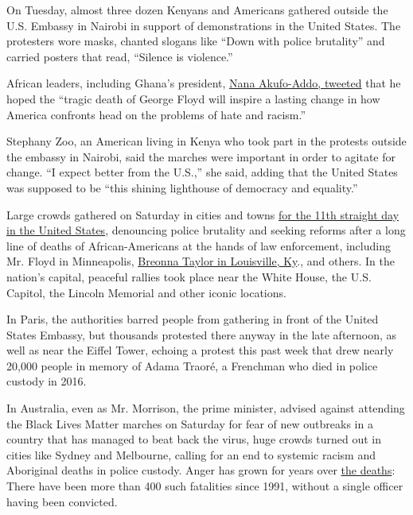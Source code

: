 On Tuesday, almost three dozen Kenyans and Americans gathered outside
the U.S. Embassy in Nairobi in support of demonstrations in the United
States. The protesters wore masks, chanted slogans like ``Down with
police brutality'' and carried posters that read, ``Silence is
violence.''

African leaders, including Ghana's president,
\href{https://twitter.com/NAkufoAddo/status/1267537316391849984}{Nana
Akufo-Addo, tweeted} that he hoped the ``tragic death of George Floyd
will inspire a lasting change in how America confronts head on the
problems of hate and racism.''

Stephany Zoo, an American living in Kenya who took part in the protests
outside the embassy in Nairobi, said the marches were important in order
to agitate for change. ``I expect better from the U.S.,'' she said,
adding that the United States was supposed to be ``this shining
lighthouse of democracy and equality.''

Large crowds gathered on Saturday in cities and towns
\href{https://www.nytimes.com/2020/06/06/us/george-floyd-protests.html}{for
the 11th straight day in the United States}, denouncing police brutality
and seeking reforms after a long line of deaths of African-Americans at
the hands of law enforcement, including Mr. Floyd in Minneapolis,
\href{https://www.nytimes.com/2020/05/21/us/fbi-louisville-shooting.html?searchResultPosition=2}{Breonna
Taylor in Louisville, Ky}., and others. In the nation's capital,
peaceful rallies took place near the White House, the U.S. Capitol, the
Lincoln Memorial and other iconic locations.

In Paris, the authorities barred people from gathering in front of the
United States Embassy, but thousands protested there anyway in the late
afternoon, as well as near the Eiffel Tower, echoing a protest this past
week that drew nearly 20,000 people in memory of Adama Traoré, a
Frenchman who died in police custody in 2016.

In Australia, even as Mr. Morrison, the prime minister, advised against
attending the Black Lives Matter marches on Saturday for fear of new
outbreaks in a country that has managed to beat back the virus, huge
crowds turned out in cities like Sydney and Melbourne, calling for an
end to systemic racism and Aboriginal deaths in police custody. Anger
has grown for years over
\href{https://www.theguardian.com/australia-news/2020/jun/06/aboriginal-deaths-in-custody-434-have-died-since-1991-new-data-shows}{the
deaths}: There have been more than 400 such fatalities since 1991,
without a single officer having been convicted.

